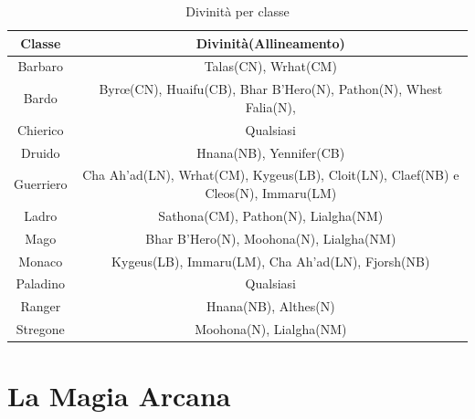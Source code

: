 \documentclass[10pt, a4paper]{report}
\begin{document}
\begin{table}[h]
\centering
{\sffamily
\begin{tabular}{||c|c||}
\hline
\bfseries Classe & \bfseries Divinità(Allineamento)\\
\hline
Barbaro & Talas(CN), Wrhat(CM)\\
\hline
Bardo & \quad Byrœ(CN), Huaifu(CB), Bhar B'Hero(N), Pathon(N), Whest Falia(N), \quad \\
\hline
Chierico & Qualsiasi\\
\hline
Druido & Hnana(NB), Yennifer(CB)\\
\hline
Guerriero & Cha Ah'ad(LN), Wrhat(CM), Kygeus(LB), Cloit(LN), Claef(NB) e Cleos(N), Immaru(LM)\\
\hline
Ladro & Sathona(CM), Pathon(N), Lialgha(NM)\\
\hline
Mago & Bhar B'Hero(N), Moohona(N), Lialgha(NM)\\
\hline
Monaco & Kygeus(LB), Immaru(LM), Cha Ah'ad(LN), Fjorsh(NB)\\
\hline
Paladino & Qualsiasi\\
\hline
Ranger & Hnana(NB), Althes(N)\\
\hline
Stregone & Moohona(N), Lialgha(NM)\\
\hline
\end{tabular}
}
\caption{Divinità per classe}
\end{table}

\chapter{La Magia Arcana}
\end{document}
